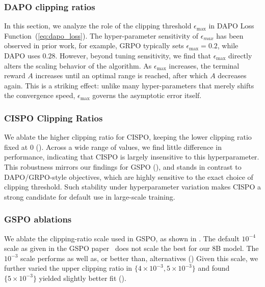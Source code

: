 \subsubsection{DAPO clipping ratios} \label{appendix:grpo_eps}
In this section, we analyze the role of the clipping threshold $\epsilon_{\max}$ in DAPO Loss Function~(\cref{eq:dapo_loss}). The hyper-parameter sensitivity of $\epsilon_{max}$ has been observed in prior work, for example, GRPO typically sets $\epsilon_{\max}=0.2$, while DAPO uses $0.28$. However, beyond tuning sensitivity, we find that $\epsilon_{\max}$ directly alters the scaling behavior of the algorithm. 
As $\epsilon_{\max}$ increases, the terminal reward $A$ increases until an optimal range is reached, after which $A$ decreases again. 
This is a striking effect: unlike many hyper-parameters that merely shifts the convergence speed, $\epsilon_{\max}$ governs the asymptotic error itself.



\subsubsection{CISPO Clipping Ratios}\label{appendix:dense_impala}
We ablate the higher clipping ratio for CISPO, keeping the lower clipping ratio fixed at $0$ (). 
Across a wide range of values, we find little difference in performance, indicating that CISPO is largely insensitive to this hyperparameter. 
This robustness mirrors our findings for GSPO (), and stands in contrast to DAPO/GRPO-style objectives, which are highly sensitive to the exact choice of clipping threshold. 
Such stability under hyperparameter variation makes CISPO a strong candidate for default use in large-scale training.


\subsubsection{GSPO ablations} \label{appendix:gspo_scale}
We ablate the clipping-ratio scale used in GSPO, as shown in . The default $10^{-4}$ scale as given in the GSPO paper~\cite{gspo} does not scale the best for our 8B model.
The $10^{-3}$ scale performs as well as, or better than, alternatives ()
Given this scale, we further varied the upper clipping ratio in $\{4\!\times\!10^{-3}, 5\!\times\!10^{-3}\}$ and found $\{5\!\times\!10^{-3}\}$ yielded slightly better fit ().




